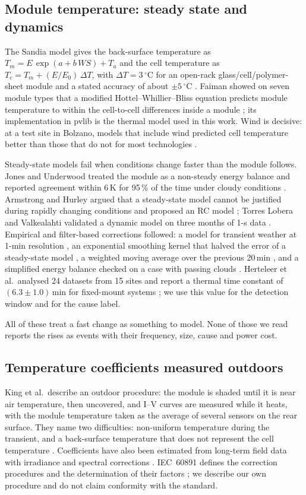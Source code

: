 \documentclass[conference]{IEEEtran}
\newcommand{\degC}{\ensuremath{^\circ}C}
\begin{document}
\subsection{Module temperature: steady state and dynamics}
The Sandia model gives the back-surface temperature as
$T_m = E\,\exp(a+b\,W\!S)+T_a$ and the cell temperature as $T_c = T_m + (E/E_0)\,\Delta T$,
with $\Delta T = 3$\,\degC{} for an open-rack glass/cell/polymer-sheet module and a
stated accuracy of about $\pm5$\,\degC{} \cite{king2004}. Faiman showed on seven module
types that a modified Hottel--Whillier--Bliss equation predicts module temperature to
within the cell-to-cell differences inside a module \cite{faiman2008}; its
implementation in pvlib \cite{pvlib2023} is the thermal model used in this work. Wind is
decisive: at a test site in Bolzano, models that include wind predicted cell temperature
better than those that do not for most technologies \cite{schwingshackl2013}.

Steady-state models fail when conditions change faster than the module follows. Jones
and Underwood treated the module as a non-steady energy balance and reported agreement
within 6\,K for 95\,\% of the time under cloudy conditions \cite{jones2001}. Armstrong
and Hurley argued that a steady-state model cannot be justified during rapidly changing
conditions and proposed an RC model \cite{armstrong2010}; Torres Lobera and Valkealahti
validated a dynamic model on three months of 1-s data \cite{lobera2013}. Empirical and
filter-based corrections followed: a model for transient weather at 1-min resolution
\cite{veldhuis2015}, an exponential smoothing kernel that halved the error of a
steady-state model \cite{barry2020}, a weighted moving average over the previous 20\,min
\cite{prilliman2020}, and a simplified energy balance checked on a case with passing
clouds \cite{hannouch2024}. Herteleer et al.\ analysed 24 datasets from 15 sites and
report a thermal time constant of $(6.3\pm1.0)$\,min for fixed-mount systems
\cite{herteleer2023}; we use this value for the detection window and for the cause label.

All of these treat a fast change as something to model. None of those we read reports
the rises as events with their frequency, size, cause and power cost.

\subsection{Temperature coefficients measured outdoors}
King et al.\ describe an outdoor procedure: the module is shaded until it is near air
temperature, then uncovered, and I--V curves are measured while it heats, with the
module temperature taken as the average of several sensors on the rear surface. They
name two difficulties: non-uniform temperature during the transient, and a back-surface
temperature that does not represent the cell temperature \cite{king1997}. Coefficients
have also been estimated from long-term field data with irradiance and spectral
corrections \cite{paudyal2021}. IEC~60891 defines the correction procedures and the
determination of their factors \cite{iec60891}; we describe our own procedure and do not
claim conformity with the standard.
\end{document}

